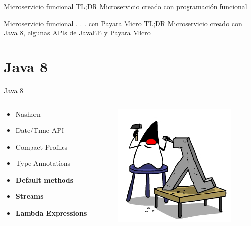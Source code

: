 \documentclass{beamer}
\begin{document}
\begin{frame}{Microservicio funcional}
\huge TL;DR Microservicio creado con programación funcional
\end{frame}

\begin{frame}{Microservicio funcional . . . con Payara Micro}
\huge TL;DR Microservicio creado con Java 8, algunas APIs de JavaEE y Payara Micro
\end{frame}

\section{Java 8}
\begin{frame}{Java 8}
     \begin{columns}[T] %
	     \begin{column}[T]{5cm} %
				\begin{itemize}
				\item Nashorn
				\item Date/Time API
				\item Compact Profiles
				\item Type Annotations
				\item \textbf{Default methods}
				\item \textbf{Streams}
				\item \textbf{Lambda Expressions}
				\end{itemize}
	     \end{column}
	     \begin{column}[T]{5cm} %
			\begin{figure}
			\centering
			\includegraphics[width=0.7\linewidth]{Images/JavaLam-1}
			\end{figure}

	     \end{column}
     \end{columns}
\end{frame}
\end{document}
